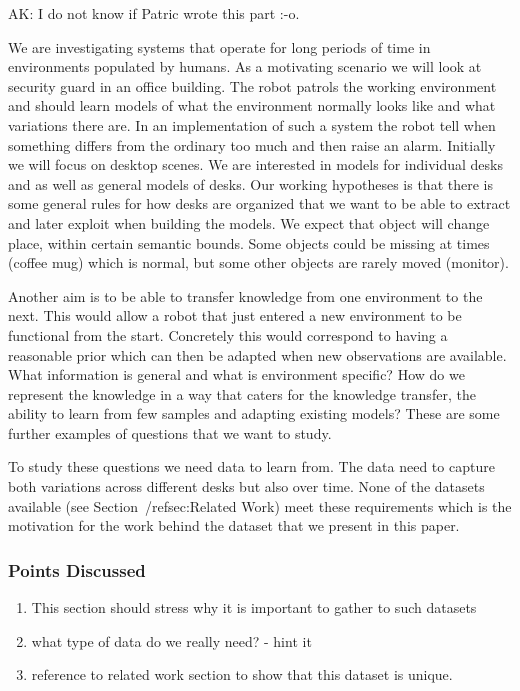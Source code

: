 \documentclass[letterpaper, 10 pt, conference]{ieeeconf}  %
\begin{document}
{\color{blue} AK: I do not know if Patric wrote this part :-o.}

We are investigating systems that operate for long periods of time in environments populated by humans. 
As a motivating scenario we will look at security guard in an office building. The robot patrols the working environment and should learn 
models of what the environment normally looks like and what variations there are. In an implementation of such a system the robot tell when 
something differs from the ordinary too much and then raise an alarm. Initially we will focus on desktop scenes. We are interested in models 
for individual desks and as well as general models of desks. Our working hypotheses is that there is some general rules for how desks are 
organized that we want to be able to extract and later exploit when building the models. We expect that object will change place, within certain semantic bounds. Some objects could be missing at times (coffee mug) which is normal, but some other objects are rarely moved (monitor).

Another aim is to be able to transfer knowledge from one environment to the next. This would allow a robot that just entered a new 
environment to be functional from the start. Concretely this would correspond to having a reasonable prior which can then be adapted when 
new observations are available. What information is general and what is environment specific? How do we represent the knowledge in a way that caters for the knowledge transfer, the ability to learn from few samples and adapting existing models? These are some further examples of questions that we want to study.

To study these questions we need data to learn from. The data need to capture both variations across different desks but also over time. None of the datasets available (see Section~/ref{sec:Related Work}) meet these requirements which is the motivation for the work behind the dataset that we present in this paper.

\subsubsection*{Points Discussed}
\begin{enumerate}
	\item This section should stress why it is important to gather to such datasets
	\item what type of data do we really need? - hint it
	\item reference to related work section to show that this dataset is unique.
\end{enumerate}
\end{document}
